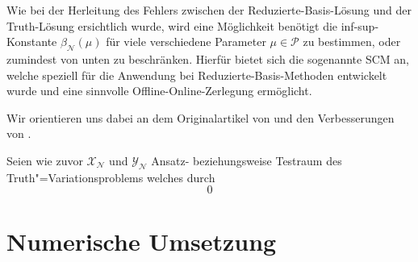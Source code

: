 \documentclass[../main.tex]{subfiles}
\begin{document}
Wie bei der Herleitung des Fehlers zwischen der Reduzierte-Basis-Lösung und der Truth-Lösung ersichtlich wurde, wird eine Möglichkeit benötigt die inf-sup-Konstante $\beta_{\mathcal N}(\mu)$ für viele verschiedene Parameter $\mu \in \mathcal P$ zu bestimmen, oder zumindest von unten zu beschränken.
Hierfür bietet sich die sogenannte \ac{SCM} an, welche speziell für die Anwendung bei Reduzierte-Basis-Methoden entwickelt wurde und eine sinnvolle Offline-Online-Zerlegung ermöglicht.

Wir orientieren uns dabei an dem Originalartikel von \textcite{Huynh2007} und den Verbesserungen von \textcite{Chen2009}.

Seien wie zuvor $\mathcal X_{\mathcal N}$ und $\mathcal Y_{\mathcal N}$ Ansatz- beziehungsweise Testraum des Truth"=Variationsproblems welches durch
\begin{equation}
0
\end{equation}




\section{Numerische Umsetzung} %
\label{sub:grb:rb:numerische_umsetzung}



\end{document}
